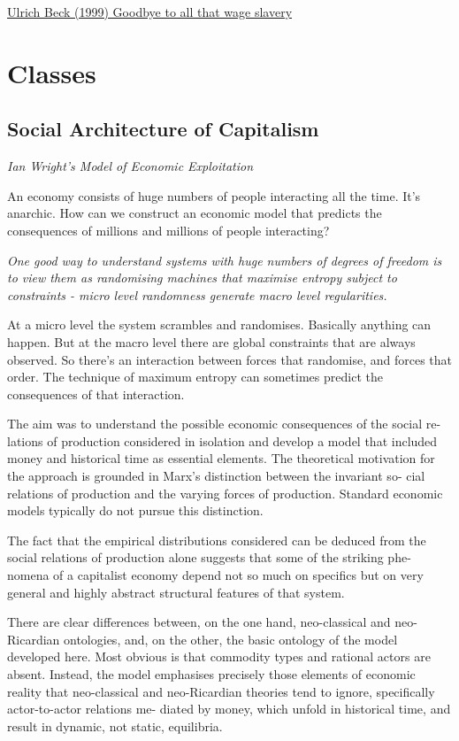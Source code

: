 \documentclass[
]{book}
\begin{document}
\href{https://www.newstatesman.com/node/148758}{Ulrich Beck (1999) Goodbye to all that wage slavery}

\hypertarget{classes}{%
\chapter{Classes}\label{classes}}

\hypertarget{social-architecture-of-capitalism}{%
\section{Social Architecture of Capitalism}\label{social-architecture-of-capitalism}}

\emph{Ian Wright's Model of Economic Exploitation}

An economy consists of huge numbers of people interacting all the time.
It's anarchic.
How can we construct an economic model that predicts
the consequences of millions and millions of people interacting?

\emph{One good way to understand systems with huge numbers of degrees of freedom is to view them as randomising machines that maximise entropy subject to constraints -
micro level randomness generate macro level regularities.}

At a micro level the system scrambles and randomises.
Basically anything can happen.
But at the macro level there are global constraints that are always observed.
So there's an interaction between forces that randomise, and forces that order.
The technique of maximum entropy can sometimes predict the consequences of that interaction.

The aim was to understand the possible economic consequences of the social re-
lations of production considered in isolation and develop a model that included
money and historical time as essential elements. The theoretical motivation
for the approach is grounded in Marx's distinction between the invariant so-
cial relations of production and the varying forces of production. Standard
economic models typically do not pursue this distinction.

The fact that the empirical distributions considered can be deduced from the
social relations of production alone suggests that some of the striking phe-
nomena of a capitalist economy depend not so much on specifics but on very
general and highly abstract structural features of that system.

There are clear differences
between, on the one hand, neo-classical and neo-Ricardian ontologies, and,
on the other, the basic ontology of the model developed here. Most obvious
is that commodity types and rational actors are absent. Instead, the model
emphasises precisely those elements of economic reality that neo-classical and
neo-Ricardian theories tend to ignore, specifically actor-to-actor relations me-
diated by money, which unfold in historical time, and result in dynamic, not
static, equilibria.
\end{document}
